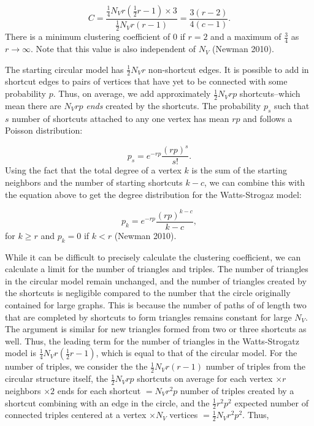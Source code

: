 \documentclass[12pt,twoside]{amherstthesis}
\begin{document}
  \[C = \frac {\frac {1} {4} N_{V} r \left(\frac {1} {2} r - 1 \right) \times 3} {\frac {1} {2} N_{V} r(r - 1)} = \frac {3(r - 2)} {4(c - 1)}.\]
  There is a minimum clustering coefficient of \(0\) if \(r = 2\) and a
  maximum of \(\frac {3} {4}\) as \(r \to \infty\). Note that this value
  is also independent of \(N_{V}\) (Newman 2010).
  
  The starting circular model has \(\frac {1} {2} N_{V}r\) non-shortcut
  edges. It is possible to add in shortcut edges to pairs of vertices that
  have yet to be connected with some probability \(p\). Thus, on average,
  we add approximately \(\frac {1} {2} N_{V}rp\) shortcuts--which mean
  there are \(N_{V}rp\) \emph{ends} created by the shortcuts. The
  probability \(p_{s}\) such that \(s\) number of shortcuts attached to
  any one vertex has mean \(rp\) and follows a Poisson distribution:
  
  \[p_{s} = e^{-rp} \frac {(rp)^{s}} {s!}.\] Using the fact that the total
  degree of a vertex \(k\) is the sum of the starting neighbors and the
  number of starting shortcuts \(k - c\), we can combine this with the
  equation above to get the degree distribution for the Watts-Strogaz
  model:
  
  \[p_{k} = e^{-rp}\frac {(rp)^{k - c}} {k - c},\] for \(k \geq r\) and
  \(p_{k} = 0\) if \(k < r\) (Newman 2010).
  
  While it can be difficult to precisely calculate the clustering
  coefficient, we can calculate a limit for the number of triangles and
  triples. The number of triangles in the circular model remain unchanged,
  and the number of triangles created by the shortcuts is negligible
  compared to the number that the circle originally contained for large
  graphs. This is because the number of paths of of length two that are
  completed by shortcuts to form triangles remains constant for large
  \(N_{V}\). The argument is similar for new triangles formed from two or
  three shortcuts as well. Thus, the leading term for the number of
  triangles in the Watts-Strogatz model is
  \(\frac {1} {4} N_{V}r \left(\frac {1} {2} r - 1 \right)\), which is
  equal to that of the circular model. For the number of triples, we
  consider the the \(\frac {1} {2} N_{V} r(r - 1)\) number of triples from
  the circular structure itself, the \(\frac {1} {2}N_{V}rp\) shortcuts on
  average for each vertex \(\times r\) neighbors \(\times 2\) ends for
  each shortcut \(= N_{V}r^{2}p\) number of triples created by a shortcut
  combining with an edge in the circle, and the
  \(\frac {1} {2} r^{2} p^2\) expected number of connected triples
  centered at a vertex \(\times N_{V}\) vertices
  \(= \frac {1} {2} N_{V} r^{2} p^2\). Thus,
  
\end{document}
